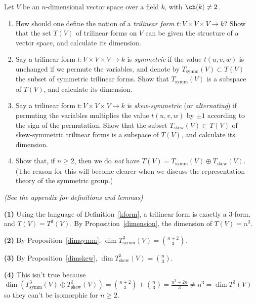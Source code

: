 \begin{problem}
Let $V$ be an $n$-dimensional vector space over a field $k$, with $\ch(k)\neq 2$. 
\begin{enumerate}
  \item How should one define the notion of a {\em trilinear form} $t:V\times V\times V\to k$? Show that the set $T(V)$ of trilinear forms on $V$ can be given the structure of a vector space, and calculate its dimension.
  \item Say a trilinear form $t:V\times V\times V\to k$ is {\em symmetric} if the value $t(u,v,w)$ is unchanged if we permute the variables, and denote by $T_{\mathrm{symm}}(V)\subset T(V)$ the subset of symmetric trilinear forms. Show that $T_{\mathrm{symm}}(V)$ is a subspace of $T(V)$, and calculate its dimension.
  \item Say a trilinear form $t:V\times V\times V\to k$ is {\em skew-symmetric} (or {\em alternating}) if permuting the variables multiplies the value $t(u,v,w)$ by $\pm 1$ according to the sign of the permutation. Show that the subset $T_{\mathrm{skew}}(V)\subset T(V)$ of skew-symmetric trilinear forms is a subspace of $T(V)$, and calculate its dimension.
  \item Show that, if $n\geq 2$, then we do {\em not} have $T(V)=T_{\mathrm{symm}}(V)\oplus T_{\mathrm{skew}}(V)$.  (The reason for this will become clearer when we discuss the representation theory of the symmetric group.)
\end{enumerate}
\end{problem}

\textit{(See the appendix for definitions and lemmas)}

\textbf{(1)} Using the language of Definition~\ref{kform}, a trilinear form is exactly a $3$-form, and $T(V)=T^3(V)$. By Proposition~\ref{dimension}, the dimension of $T(V)=n^3$. 

\textbf{(2)} By Proposition~\ref{dimsymm}, $\dim T_{\mathrm{symm}}^3(V) = \binom{n+2}{3}$.  

\textbf{(3)} By Proposition~\ref{dimskew}, $\dim T_{\mathrm{skew}}^3(V) = \binom{n}{3}$.

\textbf{(4)} This isn't true because $\dim\left(T_{\mathrm{symm}}^3(V)\oplus T_{\mathrm{skew}}^3(V)\right)=\binom{n+2}{3}+\binom{n}{3}=\frac{n^3+2n}{3} \neq n^3=\dim T^3(V)$ so they can't be isomorphic for $n\geq 2$.   